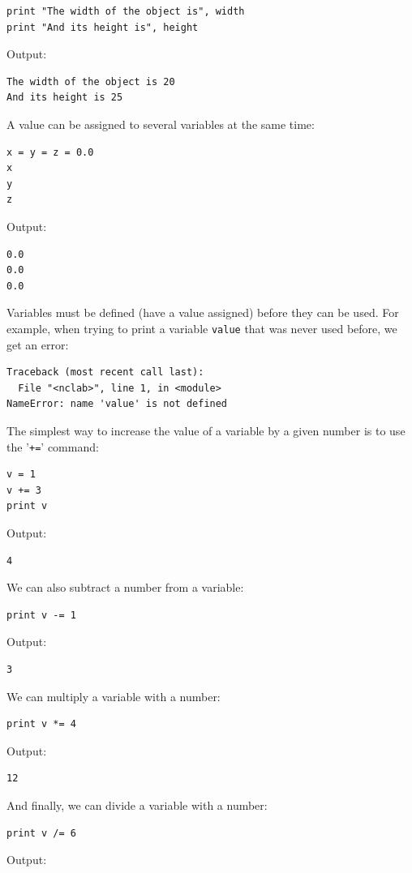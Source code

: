 \documentclass[article,A4,12pt]{llncs}
\begin{document}
\begin{verbatim}
print "The width of the object is", width
print "And its height is", height
\end{verbatim}
Output:

\begin{verbatim}
The width of the object is 20
And its height is 25
\end{verbatim}
A value can be assigned to several variables at the same time:

\begin{verbatim}
x = y = z = 0.0
x
y
z
\end{verbatim}
Output:

\begin{verbatim}
0.0
0.0
0.0
\end{verbatim}
Variables must be defined (have a value assigned) before they can be 
used. For example, when trying to print a variable {\tt value} that 
was never used before, we get an error:

\begin{verbatim}
Traceback (most recent call last):
  File "<nclab>", line 1, in <module>
NameError: name 'value' is not defined
\end{verbatim}
The simplest way to increase the value of a variable by a given number is to use the '{\tt +=}' 
command:

\begin{verbatim}
v = 1
v += 3
print v
\end{verbatim}
Output:

\begin{verbatim}
4
\end{verbatim}
We can also subtract a number from a variable:

\begin{verbatim}
print v -= 1
\end{verbatim}
Output:

\begin{verbatim}
3
\end{verbatim}
We can multiply a variable with a number:

\begin{verbatim}
print v *= 4
\end{verbatim}
Output:

\begin{verbatim}
12
\end{verbatim}
And finally, we can divide a variable with a number:

\begin{verbatim}
print v /= 6
\end{verbatim}
Output:
\end{document}
